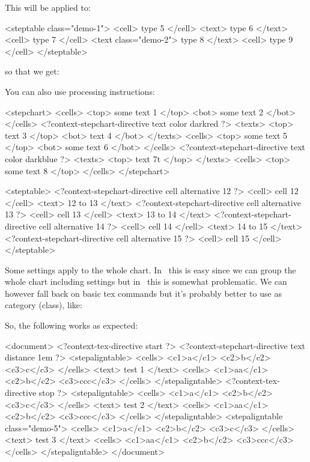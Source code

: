 \typebuffer \getbuffer

\noindentation This will be applied to:

\startbuffer
<steptable class="demo-1">
  <cell> type 5 </cell>
  <text> type 6 </text>
  <cell> type 7 </cell>
  <text class="demo-2"> type 8 </text>
  <cell> type 9 </cell>
</steptable>
\stopbuffer

\typebuffer

\noindentation so that we get:

\processxmlbuffer

You can also use processing instructions:

\startbuffer
<stepchart>
  <cells> <top> some text 1 </top> <bot> some text 2 </bot> </cells>
  <?context-stepchart-directive text color darkred ?>
  <texts> <top> text 3 </top> <bot> text 4 </bot> </texts>
  <cells> <top> some text 5 </top> <bot> some text 6 </bot> </cells>
  <?context-stepchart-directive text color darkblue ?>
  <texts> <top> text 7t </top> </texts>
  <cells> <top> some text 8 </top> </cells>
</stepchart>
\stopbuffer

\typebuffer \processxmlbuffer

\startbuffer
<steptable>
  <?context-stepchart-directive cell alternative 12 ?>
  <cell> cell 12 </cell> <text>  12 to 13 </text>
  <?context-stepchart-directive cell alternative 13 ?>
  <cell> cell 13 </cell> <text>  13 to 14 </text>
  <?context-stepchart-directive cell alternative 14 ?>
  <cell> cell 14 </cell> <text>  14 to 15 </text>
  <?context-stepchart-directive cell alternative 15 ?>
  <cell> cell 15 </cell>
</steptable>
\stopbuffer

\typebuffer \processxmlbuffer

Some settings apply to the whole chart. In \TEX\ this is easy since we
can group the whole chart including settings but in \XML\ this is somewhat
problematic. We can however fall back on basic tex commands but it's
probably better to use as category (class), like:

\startbuffer
\setupSTEPtexts[demo-5][distance=3em]
\stopbuffer

\typebuffer \getbuffer

\noindentation So, the following works as expected:

\startbuffer
<document>
  <?context-tex-directive start ?>
  <?context-stepchart-directive text distance 1em ?>
  <stepaligntable>
  <cells> <c1>a</c1> <c2>b</c2> <c3>c</c3> </cells>
  <text> test 1 </text>
  <cells> <c1>aa</c1> <c2>b</c2> <c3>ccc</c3> </cells>
  </stepaligntable>
  <?context-tex-directive stop ?>
  <stepaligntable>
    <cells> <c1>a</c1> <c2>b</c2> <c3>c</c3> </cells>
    <text> test 2 </text>
    <cells> <c1>aa</c1> <c2>b</c2> <c3>ccc</c3> </cells>
  </stepaligntable>
  <stepaligntable class="demo-5">
    <cells> <c1>a</c1> <c2>b</c2> <c3>c</c3> </cells>
    <text> test 3 </text>
    <cells> <c1>aa</c1> <c2>b</c2> <c3>ccc</c3> </cells>
  </stepaligntable>
</document>
\stopbuffer

